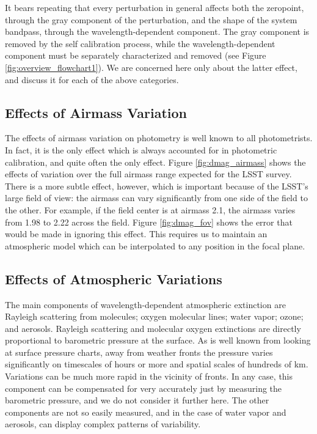 \documentclass[12pt,preprint]{aastex}
\begin{document}
It bears repeating that every perturbation in general affects both the zeropoint, through the gray component of the perturbation, and the shape of the system bandpass, through the wavelength-dependent component.  The gray component is removed by the self calibration process, while the wavelength-dependent component must be separately characterized and removed (see Figure \ref{fig:overview_flowchart1}).  We are concerned here only about the latter effect, and discuss it for each of the above categories.

\subsection{Effects of Airmass Variation}

The effects of airmass variation on photometry is well known to all photometrists.   In fact, it is the only effect which is
always accounted for in photometric calibration, and quite often the only effect.   Figure \ref{fig:dmag_airmass} shows the effects
of variation over the full airmass range expected for the LSST survey.  There is a more subtle effect, however, which is important
because of the LSST's large field of view: the airmass can vary significantly from one side of the field to the other. For example,
if the field center is at airmass 2.1, the airmass varies from 1.98 to 2.22 across the field.  Figure \ref{fig:dmag_fov} shows the error
that would be made in ignoring this effect.  This requires us to maintain an atmospheric model which can be interpolated
to any position in the focal plane.

\subsection{Effects of Atmospheric Variations}
\label{sec:atmvar}
The main components of wavelength-dependent atmospheric extinction are Rayleigh scattering from molecules; oxygen molecular lines; water vapor; ozone; and aerosols.   Rayleigh scattering and molecular oxygen extinctions are directly proportional to barometric pressure at the surface.  As is well known from looking at surface pressure charts, away from weather fronts the pressure varies significantly on timescales of hours or more and spatial scales of hundreds of km.  Variations can be much more rapid in the vicinity of fronts.   In any case, this component can be compensated for very accurately just by measuring the barometric pressure, and we do not consider it further here.  The other components are not so easily measured, and in the case of water vapor and aerosols, can display complex patterns of variability.  
\end{document}
